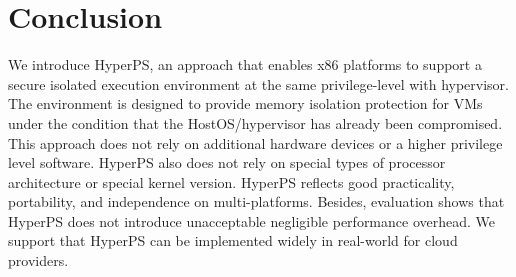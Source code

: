 \section{Conclusion}\label{sec:conclusion}
We introduce HyperPS, an approach that enables x86 platforms to support a secure isolated execution environment at the same privilege-level with hypervisor. The environment is designed to provide memory isolation protection for VMs under the condition that the HostOS/hypervisor has already been compromised. 
This approach does not rely on additional hardware devices or a higher privilege level software. HyperPS also does not rely on special types of processor architecture or special kernel version.
HyperPS reflects good practicality, portability, and independence on multi-platforms. Besides, evaluation shows that HyperPS does not introduce unacceptable negligible performance overhead. We support that HyperPS can be implemented widely in real-world for cloud providers.


